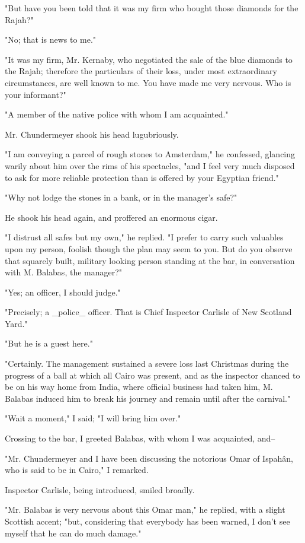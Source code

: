 "But have you been told that it was my firm who bought those diamonds
for the Rajah?"

"No; that is news to me."

"It was my firm, Mr. Kernaby, who negotiated the sale of the blue
diamonds to the Rajah; therefore the particulars of their loss, under
most extraordinary circumstances, are well known to me. You have made
me very nervous. Who is your informant?"

"A member of the native police with whom I am acquainted."

Mr. Chundermeyer shook his head lugubriously.

"I am conveying a parcel of rough stones to Amsterdam," he confessed,
glancing warily about him over the rims of his spectacles, "and I feel
very much disposed to ask for more reliable protection than is offered
by your Egyptian friend."

"Why not lodge the stones in a bank, or in the manager's safe?"

He shook his head again, and proffered an enormous cigar.

"I distrust all safes but my own," he replied. "I prefer to carry such
valuables upon my person, foolish though the plan may seem to you. But
do you observe that squarely built, military looking person standing
at the bar, in conversation with M. Balabas, the manager?"

"Yes; an officer, I should judge."

"Precisely; a _police_ officer. That is Chief Inspector Carlisle of
New Scotland Yard."

"But he is a guest here."

"Certainly. The management sustained a severe loss last Christmas
during the progress of a ball at which all Cairo was present, and as
the inspector chanced to be on his way home from India, where official
business had taken him, M. Balabas induced him to break his journey
and remain until after the carnival."

"Wait a moment," I said; "I will bring him over."

Crossing to the bar, I greeted Balabas, with whom I was acquainted,
and--

"Mr. Chundermeyer and I have been discussing the notorious Omar of
Ispahân, who is said to be in Cairo," I remarked.

Inspector Carlisle, being introduced, smiled broadly.

"Mr. Balabas is very nervous about this Omar man," he replied, with
a slight Scottish accent; "but, considering that everybody has been
warned, I don't see myself that he can do much damage."

